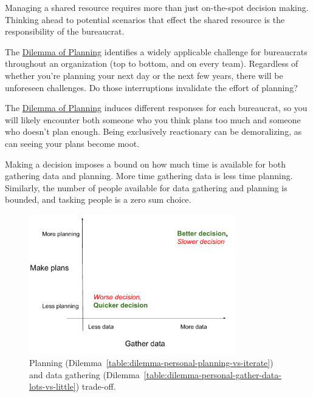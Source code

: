 Managing a shared resource requires more than just on-the-spot decision making. Thinking ahead to potential scenarios that effect the shared resource is the responsibility of the bureaucrat. 

The \hyperref[table:dilemma-personal-planning-vs-iterate]{Dilemma of Planning} identifies a widely applicable challenge for bureaucrats throughout an organization (top to bottom, and on every team). Regardless of whether you're planning your next day or the next few years, there will be unforeseen challenges. Do those interruptions invalidate the effort of planning?

The \hyperref[table:dilemma-personal-planning-vs-iterate]{Dilemma of Planning} induces different responses for each bureaucrat, so you will likely encounter both someone who you think plans too much and someone who doesn't plan enough. Being exclusively reactionary can be demoralizing, as can seeing your plans become moot.




Making a decision imposes a bound on how much time is available for both gathering data and planning. More time gathering data is less time planning. Similarly, the number of people available for data gathering and planning is bounded, and tasking people is a zero sum choice.

\begin{figure}[H] %
    \centering
    \includegraphics[width=0.8\textwidth]{images/planning_and_data_gathering.pdf}
    \caption{Planning (Dilemma~\ref{table:dilemma-personal-planning-vs-iterate}) and data gathering (Dilemma~\ref{table:dilemma-personal-gather-data-lots-vs-little}) trade-off.}
    \label{fig:pareto_frontier}
\end{figure}

